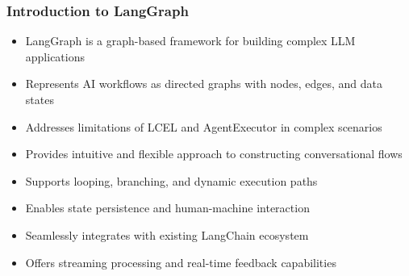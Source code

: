 \begin{frame}[fragile]\frametitle{Introduction to LangGraph}
      \begin{itemize}
        \item LangGraph is a graph-based framework for building complex LLM applications
        \item Represents AI workflows as directed graphs with nodes, edges, and data states
        \item Addresses limitations of LCEL and AgentExecutor in complex scenarios
        \item Provides intuitive and flexible approach to constructing conversational flows
        \item Supports looping, branching, and dynamic execution paths
        \item Enables state persistence and human-machine interaction
        \item Seamlessly integrates with existing LangChain ecosystem
        \item Offers streaming processing and real-time feedback capabilities
      \end{itemize}
\end{frame}



